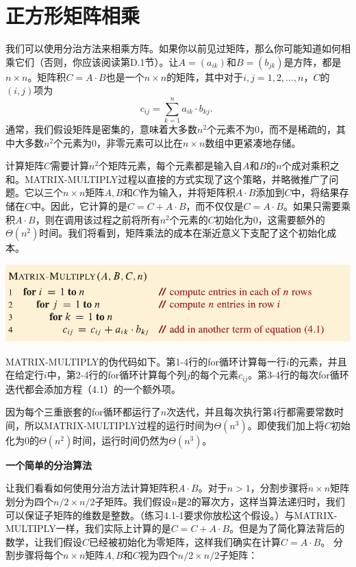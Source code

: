 \documentclass[lang=cn,newtx,10pt,scheme=chinese]{elegantbook}
\begin{document}
\section{正方形矩阵相乘}

我们可以使用分治方法来相乘方阵。如果你以前见过矩阵，那么你可能知道如何相乘它们（否则，你应该阅读第D.1节）。让$A=\left(a_{i k}\right)$和$B=\left(b_{j k}\right)$是方阵，都是$n \times n$。矩阵积$C=A \cdot B$也是一个$n \times n$的矩阵，其中对于$i, j=1,2, \ldots, n$，$C$的$(i, j)$项为
$$
c_{i j}=\sum_{k=1}^n a_{i k} \cdot b_{k j} \text {. }
$$
通常，我们假设矩阵是密集的，意味着大多数$n^2$个元素不为0，而不是稀疏的，其中大多数$n^2$个元素为0，非零元素可以比在$n \times n$数组中更紧凑地存储。

计算矩阵$C$需要计算$n^2$个矩阵元素，每个元素都是输入自$A$和$B$的$n$个成对乘积之和。MATRIX-MULTIPLY过程以直接的方式实现了这个策略，并略微推广了问题。它以三个$n \times n$矩阵$A, B$和$C$作为输入，并将矩阵积$A \cdot B$添加到$C$中，将结果存储在$C$中。因此，它计算的是$C=C+A \cdot B$，而不仅仅是$C=A \cdot B$。如果只需要乘积$A \cdot B$，则在调用该过程之前将所有$n^2$个元素的$C$初始化为0，这需要额外的$\Theta\left(n^2\right)$时间。我们将看到，矩阵乘法的成本在渐近意义下支配了这个初始化成本。

\includegraphics{算法导论第四版插图/第四章/普通矩阵相乘算法.pdf}

MATRIX-MULTIPLY的伪代码如下。第1-4行的for循环计算每一行$i$的元素，并且在给定行$i$中，第2-4行的for循环计算每个列$j$的每个元素$c_{i j}$。第3-4行的每次for循环迭代都会添加方程（4.1）的一个额外项。

因为每个三重嵌套的for循环都运行了$n$次迭代，并且每次执行第4行都需要常数时间，所以MATRIX-MULTIPLY过程的运行时间为$\Theta\left(n^3\right)$。即使我们加上将$C$初始化为0的$\Theta\left(n^2\right)$时间，运行时间仍然为$\Theta\left(n^3\right)$。

\textbf{一个简单的分治算法}

让我们看看如何使用分治方法计算矩阵积$A \cdot B$。对于$n>1$，分割步骤将$n \times n$矩阵划分为四个$n / 2 \times n / 2$子矩阵。我们假设$n$是2的幂次方，这样当算法递归时，我们可以保证子矩阵的维数是整数。（练习4.1-1要求你放松这个假设。）与MATRIX-MULTIPLY一样，我们实际上计算的是$C=C+A \cdot B$。但是为了简化算法背后的数学，让我们假设$C$已经被初始化为零矩阵，这样我们确实在计算$C=A \cdot B$。
分割步骤将每个$n \times n$矩阵$A, B$和$C$视为四个$n / 2 \times n / 2$子矩阵：
\end{document}
